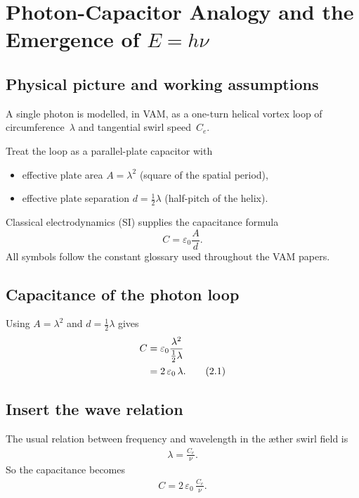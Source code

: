 
\section{Photon-Capacitor Analogy and the Emergence of $E = h\nu$}

\subsection{Physical picture and working assumptions}

A single photon is modelled, in VAM, as a one-turn helical vortex loop of circumference~$\lambda$ and tangential swirl speed~$C_e$.

Treat the loop as a parallel-plate capacitor with
\begin{itemize}
    \item effective plate area $A = \lambda^2$ (square of the spatial period),
    \item effective plate separation $d = \tfrac{1}{2}\lambda$ (half-pitch of the helix).
\end{itemize}

Classical electrodynamics (SI) supplies the capacitance formula
\[
    C = \varepsilon_0 \frac{A}{d}.
\]
All symbols follow the constant glossary used throughout the VAM papers.

\subsection{Capacitance of the photon loop}

Using $A = \lambda^2$ and $d = \tfrac{1}{2}\lambda$ gives
\begin{align}
    C &= \varepsilon_0 \frac{\lambda^2}{\tfrac{1}{2}\lambda} \notag \\
      &= 2\,\varepsilon_0\,\lambda.
    \tag{2.1}
\end{align}

\subsection{Insert the wave relation}

The usual relation between frequency and wavelength in the æther swirl field is
\begin{align}
    \lambda = \frac{C_e}{\nu}.
    \tag{3.1}
\end{align}
So the capacitance becomes
\begin{align}
    C = 2\,\varepsilon_0\,\frac{C_e}{\nu}.
    \tag{3.2}
\end{align}


